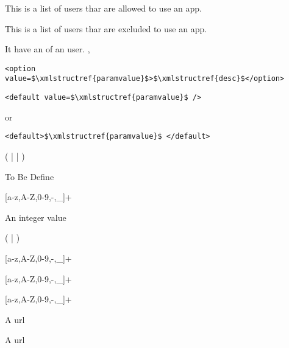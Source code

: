 \bigskip
{}
{This is a list of users thar are allowed to use an app.}
{}

\bigskip
{}
{This is a list of users thar are excluded to use an app.}
{}

\bigskip
{}
{It have an  of an user.}
{, }

\noindent
{}


\begin{lstlisting}
<option value=$\xmlstructref{paramvalue}$>$\xmlstructref{desc}$</option>
\end{lstlisting}

\noindent
{}

\begin{lstlisting}
<default value=$\xmlstructref{paramvalue}$ />
\end{lstlisting}
or
\begin{lstlisting}
<default>$\xmlstructref{paramvalue}$ </default>
\end{lstlisting}

\noindent
{}

(  |  | )

\noindent
{}

To Be Define

\noindent
{}

[a-z,A-Z,0-9,-,\_]+

\noindent
{}

An integer value

\noindent
{}

(  |  )

\noindent
{}

[a-z,A-Z,0-9,-,\_]+

\noindent
{}

[a-z,A-Z,0-9,-,\_]+

\noindent
{}

[a-z,A-Z,0-9,-,\_]+

\noindent
{}

A url

\noindent
{}

A url


